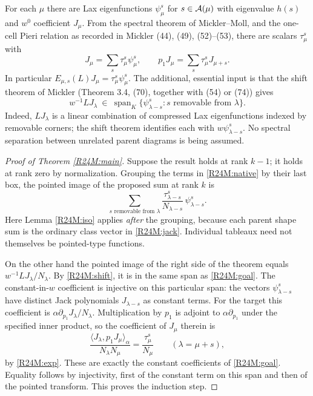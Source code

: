 \documentclass[11pt,a4paper]{article}
\begin{document}
For each $\mu$ there are Lax eigenfunctions $\psi_\mu^s$ for $s\in\mathcal A(\mu)$ with eigenvalue $h(s)$ and $w^0$ coefficient $J_\mu$. From the spectral theorem of Mickler--Moll, and the one-cell Pieri relation as recorded in Mickler (44), (49), (52)--(53), there are scalars $\tau_\mu^s$ with
\begin{equation}
 J_\mu=\sum_s\tau_\mu^s\psi_\mu^s,
 \qquad p_1J_\mu=\sum_s\tau_\mu^s J_{\mu+s}.
 \label{R24M:exp}
\end{equation}
In particular $E_{\mu,s}(L)J_\mu=\tau_\mu^s\psi_\mu^s$. The additional, essential input is that the shift theorem of Mickler (Theorem 3.4, (70), together with (54) or (74)) gives
\begin{equation}
  w^{-1}LJ_\lambda
  \ \in\ \operatorname{span}_K\{\psi_{\lambda-s}^s:s\text{ removable from }\lambda\}.
  \label{R24M:shift}
\end{equation}
Indeed, $LJ_\lambda$ is a linear combination of compressed Lax eigenfunctions indexed by removable corners; the shift theorem identifies each with $w\psi_{\lambda-s}^s$. No spectral separation between unrelated parent diagrams is being assumed.

\begin{proof}[Proof of Theorem \ref{R24M:main}]
Suppose the result holds at rank $k-1$; it holds at rank zero by normalization. Grouping the terms in \eqref{R24M:native} by their last box, the pointed image of the proposed sum at rank $k$ is
\begin{equation}
  \sum_{s\text{ removable from }\lambda}
  \frac{\tau_{\lambda-s}^s}{N_{\lambda-s}}\,\psi_{\lambda-s}^s .
  \label{R24M:goal}
\end{equation}
Here Lemma \ref{R24M:iso} applies \emph{after} the grouping, because each parent shape sum is the ordinary class vector in \eqref{R24M:jack}. Individual tableaux need not themselves be pointed-type functions.

On the other hand the pointed image of the right side of the theorem equals $w^{-1}LJ_\lambda/N_\lambda$. By \eqref{R24M:shift}, it is in the same span as \eqref{R24M:goal}. The constant-in-$w$ coefficient is injective on this particular span: the vectors $\psi_{\lambda-s}^s$ have distinct Jack polynomials $J_{\lambda-s}$ as constant terms. For the target this coefficient is $\alpha\partial_{p_1}J_\lambda/N_\lambda$. Multiplication by $p_1$ is adjoint to $\alpha\partial_{p_1}$ under the specified inner product, so the coefficient of $J_\mu$ therein is
\[
  \frac{\langle J_\lambda,p_1J_\mu\rangle_\alpha}{N_\lambda N_\mu}
  =\frac{\tau_\mu^s}{N_\mu}\qquad (\lambda=\mu+s),
\]
by \eqref{R24M:exp}. These are exactly the constant coefficients of \eqref{R24M:goal}. Equality follows by injectivity, first of the constant term on this span and then of the pointed transform. This proves the induction step.
\end{proof}
\end{document}
